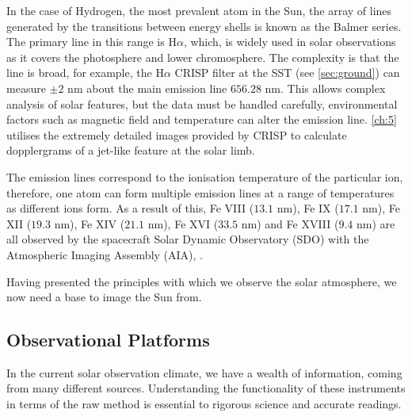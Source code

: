 In the case of Hydrogen, the most prevalent atom in the Sun, the array of lines generated by the transitions between energy shells is known as the Balmer series.
The primary line in this range is H$\alpha$, which, is widely used in solar observations as it covers the photosphere and lower chromosphere.
The complexity is that the line is broad, for example, the H$\alpha$ CRISP filter at the SST (see \ref{sec:ground}) can measure $\pm 2$ nm about the main emission line $656.28$ nm.
This allows complex analysis of solar features, but the data must be handled carefully, environmental factors such as magnetic field and temperature can alter the emission line.
\ref{ch:5} utilises the extremely detailed images provided by CRISP to calculate dopplergrams of a jet-like feature at the solar limb.




The emission lines correspond to the ionisation temperature of the particular ion, therefore, one atom can form multiple emission lines at a range of temperatures as different ions form.
As a result of this, Fe VIII ($13.1$ nm), Fe IX ($17.1$ nm), Fe XII ($19.3$ nm), Fe XIV ($21.1$ nm), Fe XVI ($33.5$ nm) and Fe XVIII ($9.4$ nm) are all observed by the spacecraft Solar Dynamic Observatory (SDO) with the Atmospheric Imaging Assembly (AIA), \cite{Schmelz2013}.


Having presented the principles with which we observe the solar atmosphere, we now need a base to image the Sun from.

\subsection{Observational Platforms }

In the current solar observation climate, we have a wealth of information, coming from many different sources.
Understanding the functionality of these instruments in terms of the raw method is essential to rigorous science and accurate readings.

